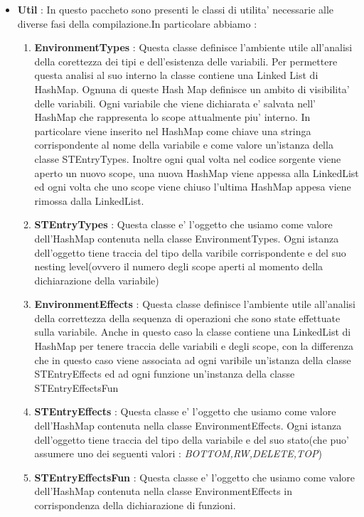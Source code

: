 \documentclass{article}
\begin{document}
\begin{itemize}
\begin{enumerate}
     \end{enumerate}
     \item\textbf{Util }: In questo paccheto sono presenti le classi di utilita' necessarie alle diverse fasi della compilazione.In particolare abbiamo :  
      \begin{enumerate}
            \item \textbf{EnvironmentTypes } : Questa classe definisce l'ambiente utile all'analisi della corettezza dei tipi e dell'esistenza delle variabili. Per permettere questa analisi al suo interno la classe contiene una Linked List di HashMap. Ognuna di  queste Hash Map definisce un ambito di visibilita' delle variabili. Ogni variabile che viene dichiarata e' salvata nell' HashMap che rappresenta lo scope attualmente piu' interno. In particolare viene inserito nel HashMap come chiave una stringa corrispondente al nome della variabile  e come valore un'istanza della classe STEntryTypes. Inoltre ogni qual volta nel codice sorgente viene aperto un nuovo scope, una nuova HashMap viene appessa alla LinkedList ed ogni volta che uno scope viene chiuso l'ultima HashMap appesa viene rimossa dalla LinkedList.
            \item \textbf{STEntryTypes } : Questa classe e' l'oggetto che usiamo come valore dell'HashMap contenuta nella classe EnvironmentTypes. Ogni istanza dell'oggetto tiene traccia del tipo della varibile corrispondente e del suo nesting level(ovvero il numero degli scope aperti al momento della dichiarazione della variabile)
            \item \textbf{EnvironmentEffects} : Questa classe definisce l'ambiente utile all'analisi della correttezza della sequenza di operazioni che sono state effettuate sulla variabile. Anche in questo caso la classe contiene una LinkedList di HashMap per tenere traccia delle variabili e degli scope, con la differenza che in questo caso viene associata ad ogni varibile un'istanza della classe STEntryEffects ed ad ogni funzione un'instanza della classe STEntryEffectsFun
            \item \textbf{STEntryEffects} : Questa classe e' l'oggetto che usiamo come valore dell'HashMap contenuta nella classe EnvironmentEffects. Ogni istanza dell'oggetto tiene traccia del tipo della variabile e del suo stato(che puo' assumere uno dei seguenti valori : \textit{BOTTOM,RW,DELETE,TOP})
            \item \textbf{STEntryEffectsFun} : Questa classe e' l'oggetto che usiamo come valore dell'HashMap contenuta nella classe EnvironmentEffects in corrispondenza della dichiarazione di funzioni.

\end{enumerate}
\end{itemize}
\end{document}
